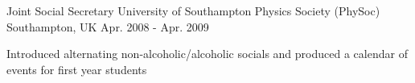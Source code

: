 

\begin{cventries}

  \cventry
    {Joint Social Secretary} %
    {University of Southampton Physics Society (PhySoc)} %
    {Southampton, UK} %
    {Apr. 2008 - Apr. 2009} %
    {
      \begin{cvitems} %
        \item {Introduced alternating non-alcoholic/alcoholic socials and produced a calendar of events for first year students}
      \end{cvitems}
    }
    
\end{cventries}
